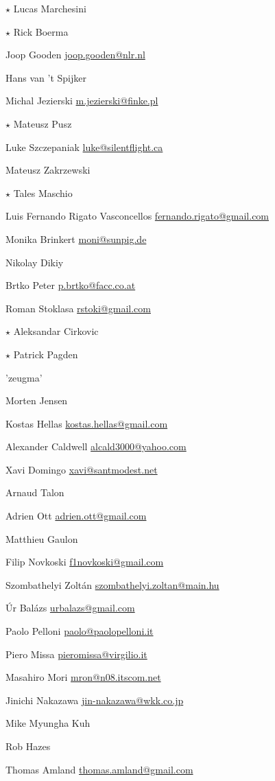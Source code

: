 \begin{compactitem}
\item$\star$  Lucas Marchesini
\item$\star$  Rick Boerma
\item Joop Gooden \url{joop.gooden@nlr.nl}
\item Hans van 't Spijker
\item Michal Jezierski \url{m.jezierski@finke.pl}
\item$\star$  Mateusz Pusz
\item Luke Szczepaniak \url{luke@silentflight.ca}
\item Mateusz Zakrzewski
\item$\star$  Tales Maschio
\item Luis Fernando Rigato Vasconcellos \url{fernando.rigato@gmail.com}
\item Monika Brinkert \url{moni@sunpig.de}
\item Nikolay Dikiy
\item Brtko Peter \url{p.brtko@facc.co.at}
\item Roman Stoklasa \url{rstoki@gmail.com}
\item$\star$  Aleksandar Cirkovic
\item$\star$  Patrick Pagden
\item 'zeugma'
\item Morten Jensen
\item Kostas Hellas \url{kostas.hellas@gmail.com}
\item Alexander Caldwell \url{alcald3000@yahoo.com}
\item Xavi Domingo \url{xavi@santmodest.net}
\item Arnaud Talon
\item Adrien Ott \url{adrien.ott@gmail.com}
\item Matthieu Gaulon
\item Filip Novkoski \url{f1novkoski@gmail.com}
\item Szombathelyi Zolt\'an \url{szombathelyi.zoltan@main.hu}
\item \'Ur Bal\'azs \url{urbalazs@gmail.com}
\item Paolo Pelloni \url{paolo@paolopelloni.it}
\item Piero Missa \url{pieromissa@virgilio.it}
\item Masahiro Mori \url{mron@n08.itscom.net}
\item Jinichi Nakazawa \url{jin-nakazawa@wkk.co.jp}
\item Mike Myungha Kuh
\item Rob Hazes
\item Thomas Amland \url{thomas.amland@gmail.com}

\end{compactitem}
